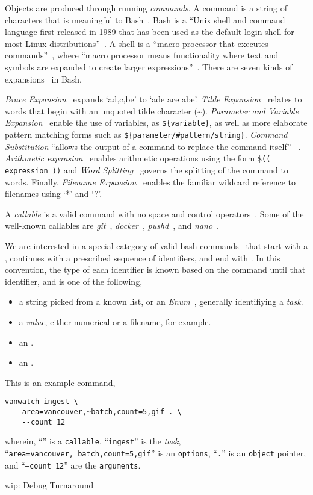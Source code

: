 Objects are produced through running \emph{commands}. A command is a string of characters that is meaningful to Bash~\cite{gnu_bash}. Bash is a \enquote{Unix shell and command language first released in 1989 that has been used as the default login shell for most Linux distributions}~\cite{bash}. A shell is a \enquote{macro processor that executes commands}~\cite{bash_manual}, where \enquote{macro processor means functionality where text and symbols are expanded to create larger expressions}~\cite{bash_manual}. There are seven kinds of expansions~\cite{bash_expansions_ref} in Bash.

\emph{Brace Expansion}~\cite{brace_expansion} expands `a{d,c,b}e' to `ade ace abe'. \emph{Tilde Expansion}~\cite{tilde_expansion} relates to words that begin with an unquoted tilde character (\textasciitilde). \emph{Parameter and Variable Expansion}~\cite{shell_parameter_expansion} enable the use of variables, as \texttt{\$\{variable\}}, as well as more elaborate pattern matching forms such as \texttt{\$\{parameter/\#pattern/string\}}. \emph{Command Substitution} \enquote{allows the output of a command to replace the command itself} ~\cite{command_substitution}. \emph{Arithmetic expansion}~\cite{arithmetic_expansion} enables arithmetic operations using the form \texttt{\$(( expression ))} and \emph{Word Splitting}~\cite{word_splitting} governs the splitting of the command to words. Finally, \emph{Filename Expansion}~\cite{filename_expansion} enables the familiar wildcard reference to filenames using `*' and `?'.

A \emph{callable} is a valid command with no space and control operators~\cite{control_operators}. Some of the well-known callables are \emph{git}~\cite{git}, \emph{docker}~\cite{docker}, \emph{pushd}~\cite{pushd}, and \emph{nano}~\cite{nano}. 

We are interested in a special category of valid bash commands~\cite{shell_syntax} that start with a , continues with a prescribed sequence of identifiers, and end with \kArguments. In this convention, the type of each identifier is known based on the command until that identifier, and is one of the following,
%
\begin{itemize}
    \item a string picked from a known list, or an \emph{Enum}~\cite{python_eunum}, generally identifiying a \emph{task}.
    \item a \emph{value}, either numerical or a filename, for example.
    \item an .
    \item an .
\end{itemize}
%
This is an example command,
%
\begin{verbatim}
vanwatch ingest \
    area=vancouver,~batch,count=5,gif . \
    --count 12
\end{verbatim}
%
wherein, ``\cVanwatch'' is a \texttt{callable}, ``\texttt{ingest}'' is the \emph{task}, ``\texttt{area=vancouver,~batch,count=5,gif}'' is an \texttt{options}, ``\texttt{.}'' is an \texttt{object} pointer, and ``\texttt{--count 12}'' are the \texttt{arguments}.


wip: Debug Turnaround